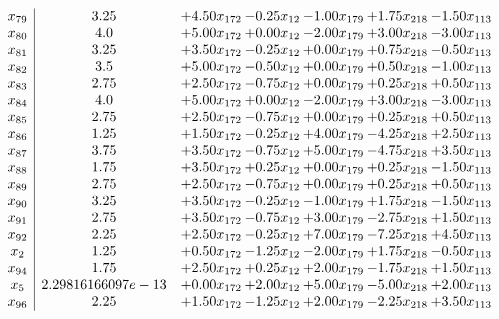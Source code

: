 \documentclass[8pt]{article}
\begin{document}
\[\begin{array}{c| c c@{\hskip 2pt} c@{\hskip 2pt} c@{\hskip 2pt} c@{\hskip 2pt} c@{\hskip 2pt} }
 x_{79}   &  3.25 & +  4.50 x_{172} & -0.25 x_{12} & -1.00 x_{179} & +  1.75 x_{218} & -1.50 x_{113}\\
 x_{80}   &  4.0 & +  5.00 x_{172} & +  0.00 x_{12} & -2.00 x_{179} & +  3.00 x_{218} & -3.00 x_{113}\\
 x_{81}   &  3.25 & +  3.50 x_{172} & -0.25 x_{12} & +  0.00 x_{179} & +  0.75 x_{218} & -0.50 x_{113}\\
 x_{82}   &  3.5 & +  5.00 x_{172} & -0.50 x_{12} & +  0.00 x_{179} & +  0.50 x_{218} & -1.00 x_{113}\\
 x_{83}   &  2.75 & +  2.50 x_{172} & -0.75 x_{12} & +  0.00 x_{179} & +  0.25 x_{218} & +  0.50 x_{113}\\
 x_{84}   &  4.0 & +  5.00 x_{172} & +  0.00 x_{12} & -2.00 x_{179} & +  3.00 x_{218} & -3.00 x_{113}\\
 x_{85}   &  2.75 & +  2.50 x_{172} & -0.75 x_{12} & +  0.00 x_{179} & +  0.25 x_{218} & +  0.50 x_{113}\\
 x_{86}   &  1.25 & +  1.50 x_{172} & -0.25 x_{12} & +  4.00 x_{179} & -4.25 x_{218} & +  2.50 x_{113}\\
 x_{87}   &  3.75 & +  3.50 x_{172} & -0.75 x_{12} & +  5.00 x_{179} & -4.75 x_{218} & +  3.50 x_{113}\\
 x_{88}   &  1.75 & +  3.50 x_{172} & +  0.25 x_{12} & +  0.00 x_{179} & +  0.25 x_{218} & -1.50 x_{113}\\
 x_{89}   &  2.75 & +  2.50 x_{172} & -0.75 x_{12} & +  0.00 x_{179} & +  0.25 x_{218} & +  0.50 x_{113}\\
 x_{90}   &  3.25 & +  3.50 x_{172} & -0.25 x_{12} & -1.00 x_{179} & +  1.75 x_{218} & -1.50 x_{113}\\
 x_{91}   &  2.75 & +  3.50 x_{172} & -0.75 x_{12} & +  3.00 x_{179} & -2.75 x_{218} & +  1.50 x_{113}\\
 x_{92}   &  2.25 & +  2.50 x_{172} & -0.25 x_{12} & +  7.00 x_{179} & -7.25 x_{218} & +  4.50 x_{113}\\
 x_{2}   &  1.25 & +  0.50 x_{172} & -1.25 x_{12} & -2.00 x_{179} & +  1.75 x_{218} & -0.50 x_{113}\\
 x_{94}   &  1.75 & +  2.50 x_{172} & +  0.25 x_{12} & +  2.00 x_{179} & -1.75 x_{218} & +  1.50 x_{113}\\
 x_{5}   &  2.29816166097e-13 & +  0.00 x_{172} & +  2.00 x_{12} & +  5.00 x_{179} & -5.00 x_{218} & +  2.00 x_{113}\\
 x_{96}   &  2.25 & +  1.50 x_{172} & -1.25 x_{12} & +  2.00 x_{179} & -2.25 x_{218} & +  3.50 x_{113}\\

\end{array}\]
\end{document}
